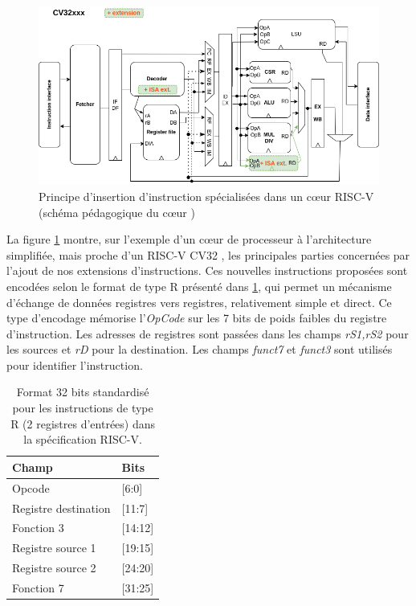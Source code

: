 \documentclass[../main.tex]{subfiles}
\begin{document}
\begin{figure}
\centering
\includegraphics[scale=0.5]{chapter3/figs/CV32xxx+Ext.png}
\caption{Principe d'insertion d'instruction spécialisées dans un cœur RISC-V (schéma pédagogique du cœur \cite{ArchiRISC:V})}
\label{RV2regs}
\end{figure}

La figure \ref{RV2regs} montre, sur l'exemple d’un cœur de processeur à l'architecture simplifiée, mais proche d'un RISC-V CV32 \cite{ArchiRISC:V}, les principales parties concernées par l'ajout de nos extensions d'instructions.
Ces nouvelles instructions proposées sont encodées selon le format de type R présenté dans \ref{R_instruction}, qui permet un mécanisme d'échange de données registres vers registres, relativement simple et direct. Ce type d'encodage mémorise l'\textit{OpCode} sur les 7 bits de poids faibles du registre d'instruction. Les adresses de registres sont passées dans les champs \textit{rS1,rS2} pour les sources et \textit{rD} pour la destination. Les champs \textit{funct7} et \textit{funct3} sont utilisés pour identifier l'instruction.

\begin{table}[]
    \centering
    \begin{tabular}{l|l}
         \textbf{Champ} & \textbf{Bits}  \\
         \bottomrule
         Opcode                 & [6:0]  \\
         Registre destination   & [11:7]  \\
         Fonction 3             & [14:12]  \\
         Registre source 1      & [19:15]  \\
         Registre source 2      & [24:20]  \\
         Fonction 7             & [31:25]  \\
    \end{tabular}
    \caption{Format 32 bits standardisé pour les instructions de type R (2 registres d'entrées) dans la spécification RISC-V.}
    \label{R_instruction}
\end{table}
\end{document}
